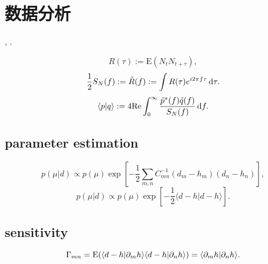 \chapter{数据分析}

\cite{Finn1992}, \cite{Maggiore2014}.

\def\la{\langle}
\def\ra{\rangle}
\begin{equation}
    R(\tau):=\text{E}(N_tN_{t+\tau}),
\end{equation}
\begin{equation}
    \frac{1}{2}S_{N}(f):=\tilde{R}(f):=\int R(\tau)e^{i2\pi f\tau}\,\mathrm{d}\tau.
\end{equation}
\begin{equation}
    \la p|q \ra:=4\text{Re}\int_0^\infty\frac{\tilde{p}^*(f)\tilde{q}(f)}{S_{N}(f)}\,\d f.
\end{equation}

\section{parameter estimation}

\begin{equation}
    p(\mu|d)\propto p(\mu)\exp\left[-\frac{1}{2}\sum_{m,n}C_{mn}^{-1}(d_m-h_m)(d_n-h_n)\right],
\end{equation}
\begin{equation}
    p(\mu|d)\propto p(\mu)\exp\left[-\frac{1}{2}\la d-h|d-h \ra\right].
\end{equation}

\section{sensitivity}

\begin{equation}
    \Gamma_{mn}=\text{E}(\la d-h|\p_m h\ra\la d-h|\p_n h \ra)=\la \p_m h|\p_n h \ra.
\end{equation}
